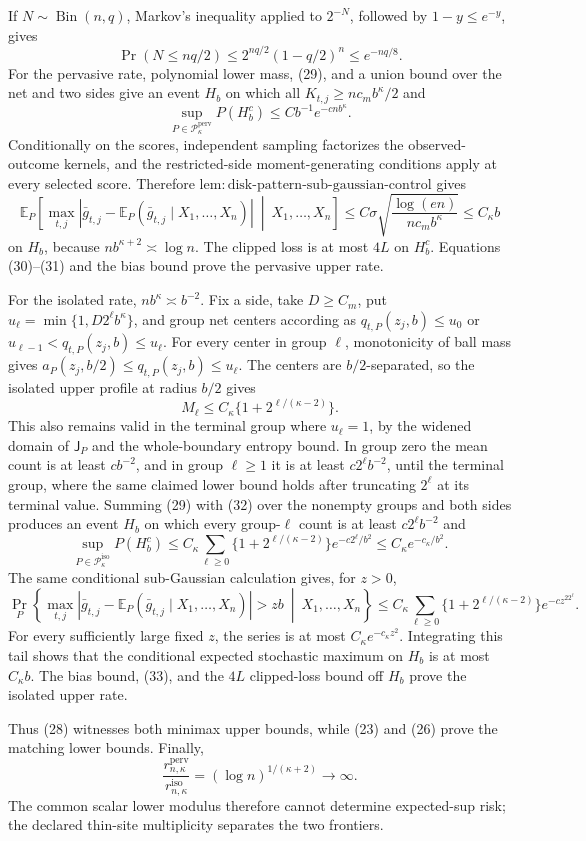 If \(N\sim\operatorname{Bin}(n,q)\), Markov's inequality applied to
\(2^{-N}\), followed by \(1-y\le e^{-y}\), gives
\[
 \Pr(N\le nq/2)\le2^{nq/2}(1-q/2)^n\le e^{-nq/8}.
 \tag{29}
\]
For the pervasive rate, polynomial lower mass, (29), and a union bound
over the net and two sides give an event \(H_b\) on which all
\(K_{t,j}\ge nc_mb^{\kappa}/2\) and
\[
 \sup_{P\in\mathcal P_{\kappa}^{\mathrm{perv}}}P(H_b^c)
 \le Cb^{-1}e^{-cnb^{\kappa}}.
 \tag{30}
\]
Conditionally on the scores, independent sampling factorizes the
observed-outcome kernels, and the restricted-side moment-generating
conditions apply at every selected score.  Therefore
\(\mathrm{lem:disk\text{-}pattern\text{-}sub\text{-}gaussian\text{-}control}\)
gives
\[
 \mathbb E_P\!\left[
 \max_{t,j}|\bar g_{t,j}-\mathbb E_P(\bar g_{t,j}\mid X_1,\ldots,X_n)|
 \ \middle|\ X_1,\ldots,X_n\right]
 \le C\sigma\sqrt{\frac{\log(en)}{nc_mb^{\kappa}}}
 \le C_{\kappa}b
 \tag{31}
\]
on \(H_b\), because \(nb^{\kappa+2}\asymp\log n\).  The clipped loss
is at most \(4L\) on \(H_b^c\).  Equations (30)--(31) and the bias bound
prove the pervasive upper rate.

For the isolated rate, \(nb^{\kappa}\asymp b^{-2}\).  Fix a side, take
\(D\ge C_m\), put \(u_\ell=\min\{1,D2^\ell b^\kappa\}\), and group net
centers according as \(q_{t,P}(z_j,b)\le u_0\) or
\(u_{\ell-1}<q_{t,P}(z_j,b)\le u_\ell\).  For every center in group
\(\ell\), monotonicity of ball mass gives
\(a_P(z_j,b/2)\le q_{t,P}(z_j,b)\le u_\ell\).  The centers are
\(b/2\)-separated, so the isolated upper profile at radius \(b/2\)
gives
\[
 M_\ell\le C_\kappa\{1+2^{\ell/(\kappa-2)}\}.
 \tag{32}
\]
This also remains valid in the terminal group where \(u_\ell=1\), by
the widened domain of \(\mathsf J_P\) and the whole-boundary entropy
bound.  In group zero the mean count is at least \(cb^{-2}\), and in
group \(\ell\ge1\) it is at least \(c2^\ell b^{-2}\), until the terminal
group, where the same claimed lower bound holds after truncating
\(2^\ell\) at its terminal value.  Summing (29) with (32) over the
nonempty groups and both sides produces an event \(H_b\) on which every
group-\(\ell\) count is at least \(c2^\ell b^{-2}\) and
\[
 \sup_{P\in\mathcal P_{\kappa}^{\mathrm{iso}}}P(H_b^c)
 \le C_\kappa\sum_{\ell\ge0}
 \{1+2^{\ell/(\kappa-2)}\}e^{-c2^\ell/b^2}
 \le C_\kappa e^{-c_\kappa/b^2}.
 \tag{33}
\]
The same conditional sub-Gaussian calculation gives, for \(z>0\),
\[
 \Pr_P\!\left\{
 \max_{t,j}|\bar g_{t,j}-\mathbb E_P(\bar g_{t,j}\mid X_1,\ldots,X_n)|
 >zb\ \middle|\ X_1,\ldots,X_n\right\}
 \le C_\kappa\sum_{\ell\ge0}
 \{1+2^{\ell/(\kappa-2)}\}e^{-cz^22^\ell}.
 \tag{34}
\]
For every sufficiently large fixed \(z\), the series is at most
\(C_\kappa e^{-c_\kappa z^2}\).  Integrating this tail shows that the
conditional expected stochastic maximum on \(H_b\) is at most
\(C_\kappa b\).  The bias bound, (33), and the \(4L\) clipped-loss bound
off \(H_b\) prove the isolated upper rate.

Thus (28) witnesses both minimax upper bounds, while (23) and (26) prove
the matching lower bounds.  Finally,
\[
 \frac{r_{n,\kappa}^{\mathrm{perv}}}{r_{n,\kappa}^{\mathrm{iso}}}
 =(\log n)^{1/(\kappa+2)}\longrightarrow\infty.
\]
The common scalar lower modulus therefore cannot determine expected-sup
risk; the declared thin-site multiplicity separates the two frontiers.